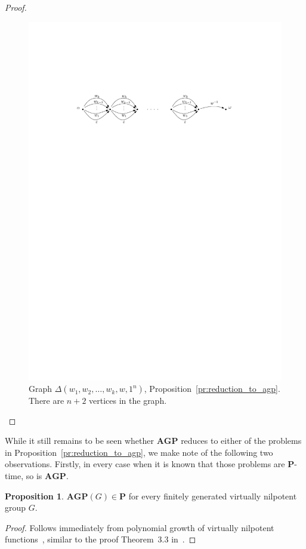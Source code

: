 \documentclass[10pt]{amsart}
\theoremstyle{definition}
\newtheorem{proposition}[theorem]{Proposition}
\def\P{{\mathbf{P}}}
\def\AGP{{\mathbf{AGP}}}
\begin{document}
\begin{proof}
\begin{figure}[h]
 \centering
 \includegraphics[width=4.5in]{bsmp.pdf}
 \caption{Graph $\Delta(w_1,w_2,\ldots,w_k,w,1^n)$, Proposition~\ref{pr:reduction_to_agp}. There are $n+2$ vertices in the graph.}\label{fi:BSMP}
\end{figure}
\end{proof}

While it still remains to be seen whether $\AGP$ reduces to either of the problems in Proposition~\ref{pr:reduction_to_agp}, we make note of the following two observations. Firstly, in every case when it is known that those problems are $\P$-time, so is $\AGP$.

\begin{proposition}\label{pr:agp_nilp}
$\AGP(G)\in\P$ for every finitely generated virtually nilpotent group $G$.
\end{proposition}
\begin{proof}
Follows immediately from polynomial growth of virtually nilpotent functions~\cite{Wolf}, similar to the proof Theorem~3.3 in~\cite{MNU1}.
\end{proof}
\end{document}
